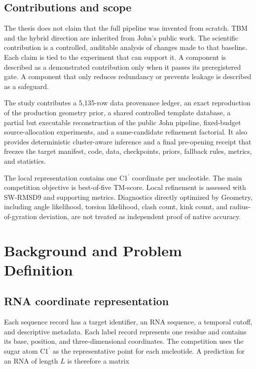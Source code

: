 \documentclass[12pt,a4paper,oneside]{report}
\newcommand{\cprime}{C1$^{\prime}$}
\begin{document}
\section{Contributions and scope}

The thesis does not claim that the full pipeline was invented from scratch. TBM and
the hybrid direction are inherited from John's public work. The scientific
contribution is a controlled, auditable analysis of changes made to that baseline.
Each claim is tied to the experiment that can support it. A component is described as
a demonstrated contribution only when it passes its preregistered gate. A component
that only reduces redundancy or prevents leakage is described as a safeguard.

The study contributes a 5,135-row data provenance ledger, an exact reproduction of the
production geometry prior, a shared controlled template database, a partial but
executable reconstruction of the public John pipeline, fixed-budget source-allocation
experiments, and a same-candidate refinement factorial. It also provides deterministic
cluster-aware inference and a final pre-opening receipt that freezes the target
manifest, code, data, checkpoints, priors, fallback rules, metrics, and statistics.

The local representation contains one \cprime{} coordinate per nucleotide. The main
competition objective is best-of-five TM-score. Local refinement is assessed with
SW-RMSD9 and supporting metrics. Diagnostics directly optimized by Geometry, including
angle likelihood, torsion likelihood, clash count, kink count, and radius-of-gyration
deviation, are not treated as independent proof of native accuracy.

\chapter{Background and Problem Definition}

\section{RNA coordinate representation}

Each sequence record has a target identifier, an RNA sequence, a temporal cutoff, and
descriptive metadata. Each label record represents one residue and contains its base,
position, and three-dimensional coordinates. The competition uses the sugar atom
\cprime{} as the representative point for each nucleotide. A prediction for an RNA of
length $L$ is therefore a matrix
\end{document}
